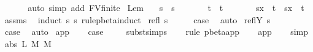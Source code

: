 \begin{isabellebody}
\ \ \isamarkupfalse%
\ {}\ \isamarkupfalse%
\ {\isacharparenleft}auto\ simp\ add{\isacharcolon}\ FV{\isacharunderscore}finite{\isacharparenright}\isanewline
{}\isamarkupfalse%
%
\endisatagproof
{\isafoldproof}%
%
\isadelimproof
%
\endisadelimproof
%
\isamarkuptrue%
\isamarkupfalse%
\ Lem{}{\isacharunderscore}{}{\isacharunderscore}{}{\isacharcolon}\isanewline
\ \ \ {\isachardoublequoteopen}s\ {\isasymggreater}\ s{\isacharprime}{\isachardoublequoteclose}\isanewline
\ \ \ \ \ \ \ {\isachardoublequoteopen}t\ {\isasymggreater}\ t{\isacharprime}{\isachardoublequoteclose}\isanewline
\ \ \ \ \ \ \ {\isachardoublequoteopen}{\isacharparenleft}s{\isacharbrackleft}x\ {\isacharcolon}{\isacharcolon}{\isacharequal}\ t{\isacharbrackright}{\isacharparenright}\ {\isasymggreater}\ {\isacharparenleft}s{\isacharprime}{\isacharbrackleft}x\ {\isacharcolon}{\isacharcolon}{\isacharequal}\ t{\isacharprime}{\isacharbrackright}{\isacharparenright}{\isachardoublequoteclose}\isanewline
%
\isadelimproof
%
\endisadelimproof
%
\isatagproof
{}\isamarkupfalse%
\ assms\ \isamarkupfalse%
\ {\isacharparenleft}induct\ s\ s{\isacharprime}\ rule{\isacharcolon}pbeta{\isachardot}induct{\isacharparenright}\isanewline
{}\isamarkupfalse%
\ {\isacharparenleft}refl\ s{\isacharparenright}\isanewline
\ \ \isamarkupfalse%
\ \isamarkupfalse%
\ {\isacharquery}case\ \isamarkupfalse%
\ auto\isanewline
{}\isamarkupfalse%
\isanewline
{}\isamarkupfalse%
\ {\isacharparenleft}reflY\ s{\isacharparenright}\isanewline
\ \ \isamarkupfalse%
\ \isamarkupfalse%
\ {\isacharquery}case\ \isamarkupfalse%
\ auto\isanewline
{}\isamarkupfalse%
\isanewline
{}\isamarkupfalse%
\ app\isanewline
\ \ \isamarkupfalse%
\ {\isacharquery}case\ \isanewline
\ \ \isamarkupfalse%
\ subst{\isachardot}simps\isanewline
\ \ \isamarkupfalse%
\ {\isacharparenleft}rule\ pbeta{\isachardot}app{\isacharparenright}\isanewline
\ \ \isamarkupfalse%
\ app\isanewline
\ \ \isamarkupfalse%
\ simp{\isacharplus}\isanewline
{}\isamarkupfalse%
\isanewline
{}\isamarkupfalse%
\ {\isacharparenleft}abs\ L\ M\ M{\isacharprime}{\isacharparenright}\ \isanewline

\end{isabellebody}
